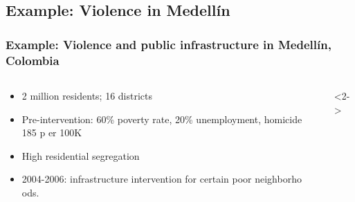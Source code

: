 \subsection{Example: Violence in Medell{\'i}n} 
\begin{frame}
\frametitle{Example: Violence and public infrastructure in Medell{\'i}n, Colombia}
\begin{columns}
  \begin{column}{.5\linewidth}
    \begin{itemize}
    \item 2 million residents; 16 districts
    \item Pre-intervention: 60\% poverty rate, 20\% unemployment, homicide 185 p
er 100K
    \item High residential segregation
    \item<2-> 2004-2006: infrastructure intervention for certain poor neighborho
ods.
    \end{itemize}
  \end{column}
  \begin{column}{.5\linewidth}
\only<2-\mynoteonly>{}
  \end{column}
\end{columns}

\end{frame}



